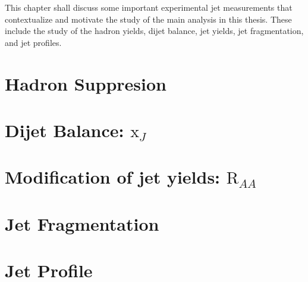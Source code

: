 
This chapter shall discuss some important experimental jet measurements that contextualize and motivate the study of the main analysis in this thesis.
These include the study of the hadron yields, dijet balance, jet yields, jet fragmentation, and jet profiles.

%

%

\section{Hadron Suppresion}
\label{sec:hadron_suppresion}


\section{Dijet Balance: $\mathrm{x}_{J}$}
\label{sec:xj}


\section{Modification of jet yields: $\mathrm{R}_{AA}$}
\label{sec:jet_raa}


\section{Jet Fragmentation}
\label{sec:jet_ff}


\section{Jet Profile}
\label{sec:jet_shape}









